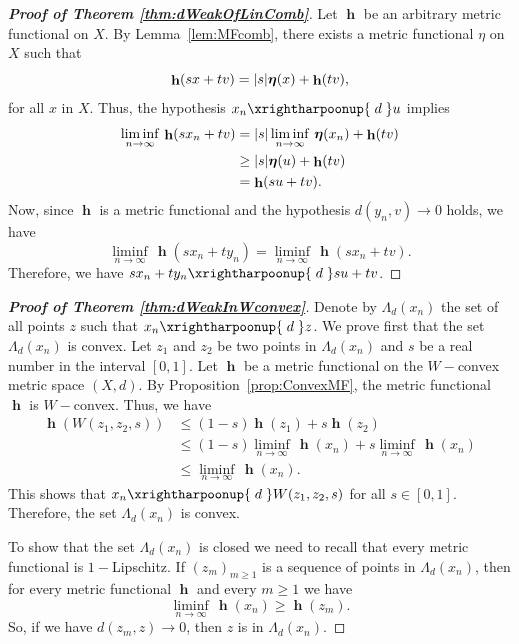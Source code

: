 \documentclass[a4paper,12pt]{article}
\theoremstyle{definition}
\DeclareMathOperator{\h}{\mathbf{h}}
\newcommand{\abs}[1]{\lvert#1\rvert}
\numberwithin{equation}{section}
\begin{document}
\begin{proof}[\bf Proof of Theorem \ref{thm:dWeakOfLinComb}]
Let $\h$ be an arbitrary metric functional on $X$. By Lemma~\ref{lem:MFcomb}, there 
exists a metric functional {\boldmath$\eta$} on $X$ such that
$$
\h(sx + tv) = \abs{s}\mbox{\boldmath$\eta$}(x) + \h(tv),
$$
for all $x$ in $X$. Thus, the hypothesis $x_n \xrightharpoonup{\;d\;} u$ implies
\begin{align*}
	\liminf_{n\to\infty}\,\h(sx_n + tv) 
		&= \abs{s}\liminf_{n\to\infty}\,\mbox{\boldmath$\eta$}(x_n) + \h(tv) \\
		&\geq \abs{s}\mbox{\boldmath$\eta$}(u) + \h(tv) \\
		&= \h(su + tv). 
\end{align*}
Now, since $\h$ is a metric functional and the hypothesis $d(y_n,v) \rightarrow 0$ 
holds, we have
$$
	\liminf_{n\to\infty}\,\h(sx_n + ty_n) = \liminf_{n\to\infty}\,\h(sx_n + tv).
$$ 
Therefore, we have $sx_n + ty_n \xrightharpoonup{\;d\;} su + tv$.
\end{proof}

\begin{proof}[\bf Proof of Theorem \ref{thm:dWeakInWconvex}]
	
Denote by $\Lambda_d(x_n)$ the set of all points $z$ such that
$x_n \xrightharpoonup{\;d\;} z$.
We prove first that the set $\Lambda_d(x_n)$ is convex. Let $z_1$ and $z_2$ be
two points in $\Lambda_d(x_n)$ and $s$ be a real number in the interval 
$[0,1]$. Let $\h$ be a metric functional on the $W-$convex metric space $(X,d)$.
By Proposition~\ref{prop:ConvexMF}, the metric functional $\h$ is $W-$convex. Thus, 
we have
\begin{align*}
	\h(W(z_1,z_2,s)) &\leq (1-s)\h(z_1) + s\h(z_2) \\
	&\leq (1-s)\liminf_{n\to\infty}\,\h(x_n)
	+ s\liminf_{n\to\infty}\,\h(x_n) \\
	&\leq \liminf_{n\to\infty}\,\h(x_n).
\end{align*}
This shows that $x_n \xrightharpoonup{\;d\;} W(z_1,z_2,s)$ for all 
$s\in [0,1]$. Therefore, the set $\Lambda_d(x_n)$ is convex.
	
To show that the set $\Lambda_d(x_n)$ is closed we need to recall that
every metric functional is $1-$Lipschitz. If $(z_m)_{m\geq 1}$ is a 
sequence of points in $\Lambda_d(x_n)$, then 
for every metric functional $\h$ and every $m\geq 1$ we have
$$
	\liminf_{n\to\infty}\,\h(x_n) \geq \h(z_m).
$$
So, if we have $d(z_m,z)\to 0$, then $z$ is in $\Lambda_d(x_n)$.
\end{proof}

	


\end{document}
